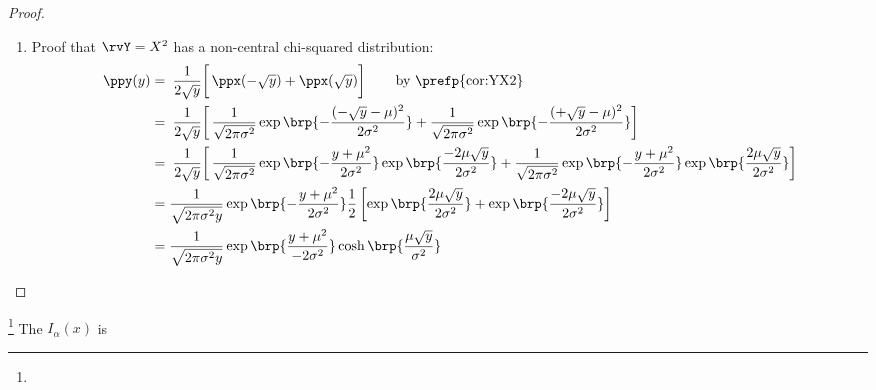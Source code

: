 \begin{theorem}
\end{theorem}
\begin{proof}
\begin{enumerate}
\item Proof that $\rvY=X^2$ has a non-central chi-squared distribution:
\begin{align*}
  \ppy(y)
    &= \left.\left.\frac{1}{2\sqrt{y}}\right[
       \ppx(-\sqrt{y}) + \ppx( \sqrt{y}) \right]
    \qquad\text{by \prefp{cor:YX2}}
  \\&= \left.\left.\frac{1}{2\sqrt{y}}\right[
       \frac{1}{\sqrt{2\pi\sigma^2}} \exp\brp{-\frac{(-\sqrt{y}-\mu)^2}{2\sigma^2}}+
       \frac{1}{\sqrt{2\pi\sigma^2}} \exp\brp{-\frac{(+\sqrt{y}-\mu)^2}{2\sigma^2}}
       \right]
  \\&= \left.\left.\frac{1}{2\sqrt{y}}\right[
       \frac{1}{\sqrt{2\pi\sigma^2}} \exp\brp{-\frac{y+\mu^2 }{2\sigma^2}} \exp\brp{\frac{-2\mu\sqrt{y}}{2\sigma^2}}+
       \frac{1}{\sqrt{2\pi\sigma^2}} \exp\brp{-\frac{y+\mu^2 }{2\sigma^2}} \exp\brp{\frac{ 2\mu\sqrt{y}}{2\sigma^2}}
       \right]
  \\&= \frac{1}{\sqrt{2\pi\sigma^2y}} \exp\brp{-\frac{y+\mu^2 }{2\sigma^2}}
       \frac{1}{2}
       \left[
         \exp\brp{\frac{ 2\mu\sqrt{y}}{2\sigma^2}} +
         \exp\brp{\frac{-2\mu\sqrt{y}}{2\sigma^2}}
       \right]
  \\&= \frac{1}{\sqrt{2\pi\sigma^2y}} \exp\brp{\frac{y+\mu^2 }{-2\sigma^2}}
         \cosh\brp{\frac{ \mu\sqrt{y}}{\sigma^2}}
\end{align*}
\end{enumerate}
\end{proof}

\begin{definition}
\footnote{
  }
The 
$I_\alpha(x)$ is
\end{definition}


